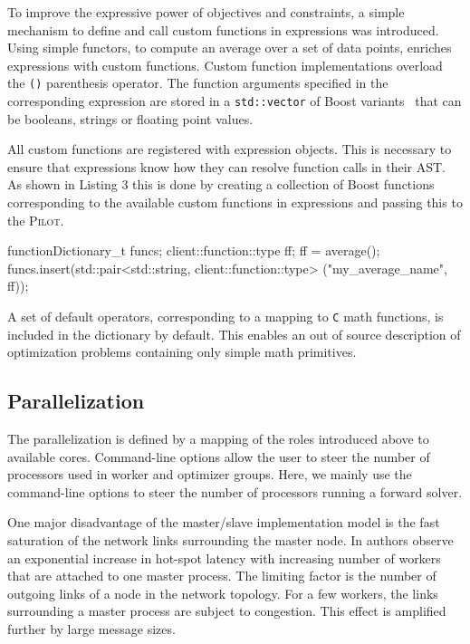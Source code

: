 \documentclass[preprint,linenumbers,amsmath,amssymb,aps,prstab]{revtex4-1}%
\begin{document}
To improve the expressive power of objectives and constraints, a
  simple mechanism to define and call custom functions in expressions was introduced.
Using simple functors, to compute an
  average over a set of data points, enriches expressions with custom
  functions.
Custom function implementations overload the \texttt{()} parenthesis operator.
The function arguments specified in the corresponding expression are stored in
  a \texttt{std::vector} of Boost variants~\cite{boost2} that can be
  booleans, strings or floating point values.

All custom functions are registered with expression objects.
This is necessary to ensure that expressions know how they can resolve
  function calls in their AST.
As shown in Listing 3 this is done by creating a collection of Boost
  functions~\cite{boost3} corresponding to the
  available custom functions in expressions and passing this to the
  \textsc{Pilot}.

\begin{code}
functionDictionary_t funcs;
client::function::type ff;
ff = average();
funcs.insert(std::pair<std::string, 
		client::function::type> 
       		("my_average_name", ff));
\end{code}

A set of default operators, corresponding to a mapping to \texttt{C} math
  functions, is included in the dictionary by default.
This enables an out of source description of optimization problems containing
  only simple math primitives.


\subsection{Parallelization} \label{sec:parallelization}

The parallelization is defined by a mapping of the roles introduced above to
  available cores.
Command-line options allow the user to steer the number of processors used in
  worker and optimizer groups.
Here, we mainly use the command-line options to steer the number of processors
  running a forward solver.

One major disadvantage of the master/slave implementation model is the fast
  saturation of the network links surrounding the master node.
In \cite{bctg:09} authors observe an exponential increase in hot-spot latency
  with increasing number of workers that are attached to one master process.
The limiting factor is the number of outgoing links of a node in the
  network topology. For a few workers, the links surrounding a
  master process are subject to congestion.
This effect is amplified further by large message sizes.
\end{document}
